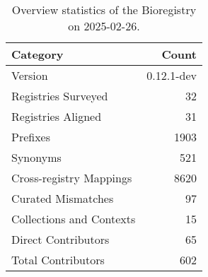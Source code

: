 \begin{table}
\caption{Overview statistics of the Bioregistry on 2025-02-26.}
\label{tab:bioregistry-summary}
\begin{tabular}{lr}
\toprule
Category & Count \\
\midrule
Version & 0.12.1-dev \\
Registries Surveyed & 32 \\
Registries Aligned & 31 \\
Prefixes & 1903 \\
Synonyms & 521 \\
Cross-registry Mappings & 8620 \\
Curated Mismatches & 97 \\
Collections and Contexts & 15 \\
Direct Contributors & 65 \\
Total Contributors & 602 \\
\bottomrule
\end{tabular}
\end{table}
